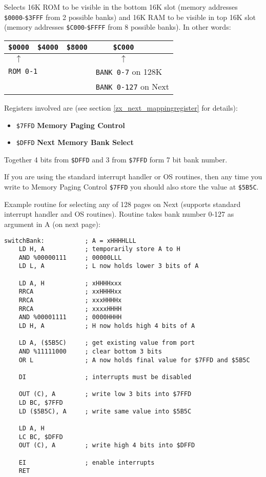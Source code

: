 \documentclass[twoside,openright,a4paper]{book}
\begin{document}
Selects 16K ROM to be visible in the bottom 16K slot (memory addresses {\tt \$0000}-{\tt \$3FFF} from 2 possible banks) and 16K RAM to be visible in top 16K slot (memory addresses {\tt \$C000}-{\tt \$FFFF} from 8 possible banks). In other words:

\begin{tabular}{ccccl}
	{\tt \$0000} & {\tt \$4000} & {\tt \$8000} & {\tt \$C000} & \\
	\hline
	$\uparrow$ & & & $\uparrow$ & \\
	\multicolumn{2}{l}{\tt ROM 0-1} & & \multicolumn{2}{l}{{\tt BANK 0-7} on 128K} \\
	& & & \multicolumn{2}{l}{{\tt BANK 0-127} on Next} \\
\end{tabular}

Registers involved are (see section \ref{zx_next_mappingregister} for details):

\begin{itemize}
	\item {\tt \$7FFD} \textbf{Memory Paging Control}
	\item {\tt \$DFFD} \textbf{Next Memory Bank Select}
\end{itemize}

Together 4 bits from {\tt \$DFFD} and 3 from {\tt \$7FFD} form 7 bit bank number.

If you are using the standard interrupt handler or OS routines, then any time you write to Memory Paging Control {\tt \$7FFD} you should also store the value at {\tt \$5B5C}.

Example routine for selecting any of 128 pages on Next (supports standard interrupt handler and OS routines). Routine takes bank number 0-127 as argument in A (on next page):

\pagebreak
\begin{Verbatim}
switchBank:           ; A = xHHHHLLL
	LD H, A           ; temporarily store A to H
	AND %00000111     ; 00000LLL
	LD L, A           ; L now holds lower 3 bits of A

	LD A, H           ; xHHHHxxx
	RRCA              ; xxHHHHxx
	RRCA              ; xxxHHHHx
	RRCA              ; xxxxHHHH
	AND %00001111     ; 0000HHHH
	LD H, A           ; H now holds high 4 bits of A

	LD A, ($5B5C)     ; get existing value from port
	AND %11111000     ; clear bottom 3 bits
	OR L              ; A now holds final value for $7FFD and $5B5C

	DI                ; interrupts must be disabled

	OUT (C), A        ; write low 3 bits into $7FFD
	LD BC, $7FFD
	LD ($5B5C), A     ; write same value into $5B5C

	LD A, H
	LC BC, $DFFD
	OUT (C), A        ; write high 4 bits into $DFFD

	EI                ; enable interrupts
	RET
\end{Verbatim}
\end{document}
